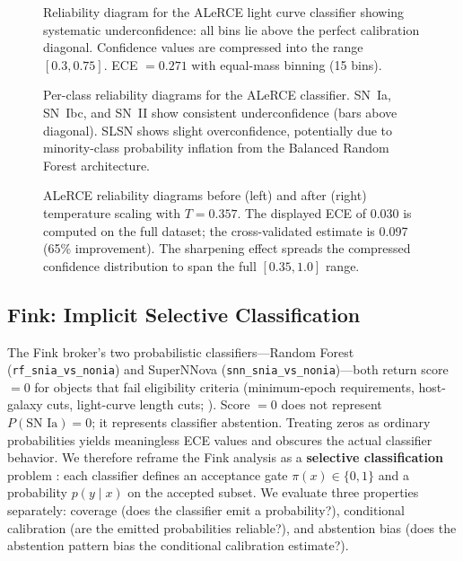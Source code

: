 \documentclass[twocolumn]{aastex631}
\begin{document}
\begin{figure}
\caption{Reliability diagram for the ALeRCE light curve classifier showing systematic underconfidence: all bins lie above the perfect calibration diagonal. Confidence values are compressed into the range $[0.3, 0.75]$. ECE $= 0.271$ with equal-mass binning (15 bins). \label{fig:alerce_reliability}}
\end{figure}

\begin{figure}
\caption{Per-class reliability diagrams for the ALeRCE classifier. SN~Ia, SN~Ibc, and SN~II show consistent underconfidence (bars above diagonal). SLSN shows slight overconfidence, potentially due to minority-class probability inflation from the Balanced Random Forest architecture. \label{fig:alerce_perclass}}
\end{figure}

\begin{figure}
\caption{ALeRCE reliability diagrams before (left) and after (right) temperature scaling with $T = 0.357$. The displayed ECE of 0.030 is computed on the full dataset; the cross-validated estimate is 0.097 (65\% improvement). The sharpening effect spreads the compressed confidence distribution to span the full $[0.35, 1.0]$ range. \label{fig:alerce_tempscaling}}
\end{figure}


\subsection{Fink: Implicit Selective Classification} \label{sec:fink}

The Fink broker's two probabilistic classifiers---Random Forest (\texttt{rf\_snia\_vs\_nonia}) and SuperNNova (\texttt{snn\_snia\_vs\_nonia})---both return score $= 0$ for objects that fail eligibility criteria (minimum-epoch requirements, host-galaxy cuts, light-curve length cuts; \citealt{leoni2022, moller2020}). Score $= 0$ does not represent $P(\text{SN~Ia}) = 0$; it represents classifier abstention. Treating zeros as ordinary probabilities yields meaningless ECE values and obscures the actual classifier behavior. We therefore reframe the Fink analysis as a \textbf{selective classification} problem \citep{geifman2017}: each classifier defines an acceptance gate $\pi(x) \in \{0, 1\}$ and a probability $p(y \mid x)$ on the accepted subset. We evaluate three properties separately: coverage (does the classifier emit a probability?), conditional calibration (are the emitted probabilities reliable?), and abstention bias (does the abstention pattern bias the conditional calibration estimate?).
\end{document}
